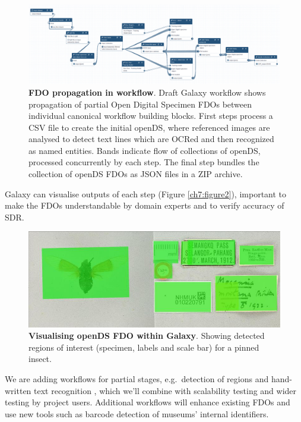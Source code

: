 \begin{figure}%
    \includegraphics[width=\textwidth]{figures/ch07/figure1.png}
	\caption[FDO propagation in workflow]{\textbf{FDO propagation in workflow}. 
    Draft Galaxy workflow \cite{Brack 2022} 
    shows propagation of partial Open Digital Specimen FDOs between
    individual canonical workflow building blocks. First steps process a CSV
    file to create the initial openDS, where referenced images are analysed
    to detect text lines which are OCRed and then recognized as named
    entities. Bands indicate flow of collections of openDS, processed
    concurrently by each step. The final step bundles the collection of
    openDS FDOs as JSON files in a ZIP archive.}
    \label{ch7:figure1}
  \end{figure}

Galaxy can visualise outputs of each step
(Figure \vref{ch7:figure2}), important to make the
FDOs understandable by domain experts and to verify accuracy of SDR.

\begin{figure}%
    \includegraphics[width=\textwidth]{figures/ch07/figure2.jpg}
	\caption[Visualising openDS FDO within Galaxy]{\textbf{Visualising openDS FDO within Galaxy}.
    Showing detected regions of interest
    (specimen, labels and scale bar) for a pinned insect.}
    \label{ch7:figure2}
\end{figure}

We are adding workflows for partial stages, e.g.~detection of regions
\cite{Livermore 2022a} and hand-written text recognition
\cite{Livermore 2022b}, which we'll combine with scalability testing and wider
testing by project users. Additional workflows will enhance existing
FDOs and use new tools such as barcode detection of museums' internal
identifiers.

